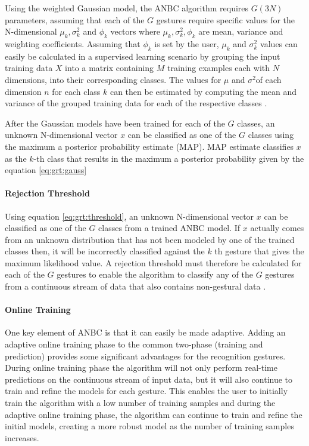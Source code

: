 Using the weighted Gaussian model, the ANBC algorithm requires $G(3N)$ parameters, assuming that each of the $G$ gestures require specific values for the N-dimensional $ \mu_{k} , \sigma_{k}^{2} $ and $ \phi_{k} $ vectors where $ \mu_{k} , \sigma_{k}^{2},\phi_{k}$ are mean, variance and weighting coefficients. Assuming that $ \phi_{k} $ is set by the user, $ \mu_{k} $ and $\sigma_{k}^{2} $ values can easily be calculated in a supervised learning scenario by grouping the input training data $X$ into a matrix containing $M$ training examples each with $N$ dimensions, into their corresponding classes. The values for $ \mu$ and $\sigma^{2} $of each dimension $n$ for each class $k$ can then be estimated by computing the mean and variance of the grouped training data for each of the respective classes \cite{14}.



After the Gaussian models have been trained for each of the $G$ classes, an unknown N-dimensional vector $x$ can be classified as one of the $G$ classes using the maximum a posterior probability estimate (MAP). MAP estimate classifies $x$ as the $k$-th class that results in the maximum a posterior probability given by the equation \ref{eq:grt:gauss}



\paragraph*{Rejection Threshold} Using equation \ref{eq:grt:threshold}, an unknown N-dimensional vector $x$ can be classified as one of the $G$ classes from a trained ANBC model. If $x$ actually comes from an unknown distribution that has not been modeled by one of the trained classes then, it will be incorrectly classified against the $k$ th gesture that gives the maximum likelihood value. A rejection threshold must therefore be calculated for each of the $G$ gestures to enable the algorithm to classify any of the $G$ gestures from a continuous stream of data that also contains non-gestural data \cite{14}.

\paragraph*{Online Training} One key element of ANBC is that it can easily be made adaptive. Adding an adaptive online training phase to the common two-phase (training and prediction) provides some significant advantages for the recognition gestures. During online training phase the algorithm will not only perform real-time predictions on the continuous stream of input data, but it will also continue to train and refine the models for each gesture. This enables the user to initially train the algorithm with a low number of training samples and during the adaptive online training phase, the algorithm can continue to train and refine the initial models, creating a more robust model as the number of training samples increases.

